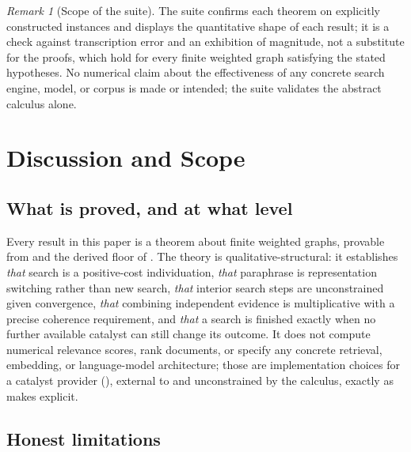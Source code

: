 \documentclass[11pt,twocolumn,a4paper]{article}
\theoremstyle{thmstyle}
\theoremstyle{definition}
\theoremstyle{remark}
\newtheorem{remark}[theorem]{Remark}
\begin{document}
\begin{remark}[Scope of the suite]
\label{rem:val-scope}
The suite confirms each theorem on explicitly constructed instances and
displays the quantitative shape of each result; it is a check against
transcription error and an exhibition of magnitude, not a substitute for
the proofs, which hold for every finite weighted graph satisfying the
stated hypotheses. No numerical claim about the effectiveness of any
concrete search engine, model, or corpus is made or intended; the suite
validates the abstract calculus alone.
\end{remark}



\section{Discussion and Scope}
\label{sec:discussion}

\subsection{What is proved, and at what level}

Every result in this paper is a theorem about finite weighted graphs,
provable from  and the derived floor of
. The theory is qualitative-structural: it establishes
\emph{that} search is a positive-cost individuation, \emph{that}
paraphrase is representation switching rather than new search, \emph{that}
interior search steps are unconstrained given convergence, \emph{that}
combining independent evidence is multiplicative with a precise coherence
requirement, and \emph{that} a search is finished exactly when no further
available catalyst can still change its outcome. It does not compute
numerical relevance scores, rank documents, or specify any concrete
retrieval, embedding, or language-model architecture; those are
implementation choices for a catalyst provider (),
external to and unconstrained by the calculus, exactly as
 makes explicit.

\subsection{Honest limitations}
\end{document}

